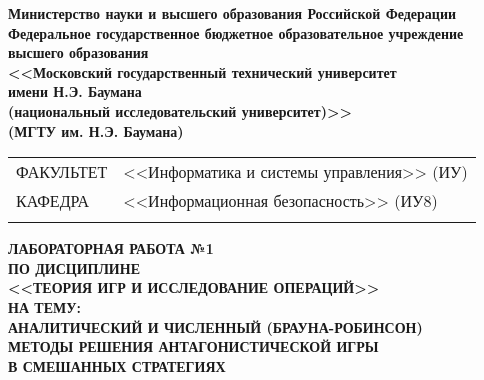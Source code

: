  
\pagestyle{empty}
\noindent\begin{minipage}{0.05\textwidth}
\end{minipage}
\hfill
\begin{minipage}{0.85\textwidth}\raggedleft
    \begin{center}
        \fontsize{11pt}{0.3\baselineskip}\selectfont \textbf{Министерство науки и высшего образования Российской Федерации \\ Федеральное государственное бюджетное образовательное учреждение \\ высшего образования \\ <<Московский государственный технический университет \\ имени Н.Э. Баумана \\ (национальный исследовательский университет)>> \\ (МГТУ им. Н.Э. Баумана)}
    \end{center}
\end{minipage}

\begin{center}
    \fontsize{12pt}{0.1\baselineskip}\selectfont
    \noindent\makebox[\linewidth]{\rule{\textwidth}{2pt}} \makebox[\linewidth]{\rule{\textwidth}{1pt}}
\end{center}
\noindent
\begin{tabularx}{\textwidth}{l X}
    {\fontsize{12pt}{12pt}\selectfont ФАКУЛЬТЕТ}
                                              &
    {\fontsize{12pt}{12pt}\selectfont <<Информатика и системы управления>> (ИУ)} \\
    \hhline{~~}
    {\fontsize{12pt}{12pt}\selectfont КАФЕДРА} &
    {\fontsize{12pt}{12pt}\selectfont <<Информационная безопасность>> (ИУ8)}     \\
    \hhline{~~}
\end{tabularx}

\vfill

\noindent
{\centering\rmfamily\bfseries\fontsize{16pt}{16pt}\selectfont
    ЛАБОРАТОРНАЯ РАБОТА №1 \\
    ПО ДИСЦИПЛИНЕ \\ 
    <<ТЕОРИЯ ИГР И ИССЛЕДОВАНИЕ ОПЕРАЦИЙ>> \\
    НА ТЕМУ: \\ \bigskip
    АНАЛИТИЧЕСКИЙ И ЧИСЛЕННЫЙ (БРАУНА-РОБИНСОН) \\ МЕТОДЫ РЕШЕНИЯ АНТАГОНИСТИЧЕСКОЙ ИГРЫ \\ В СМЕШАННЫХ СТРАТЕГИЯХ \\ 
}

